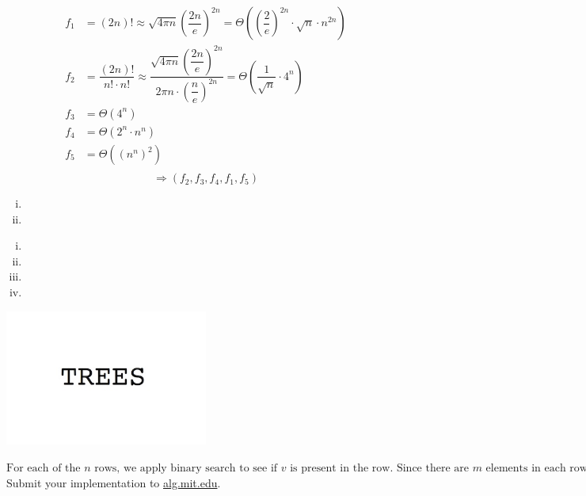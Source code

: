 \documentclass[12pt,twoside]{article}
\begin{document}
\begin{problems}
\begin{problemparts}
\problempart %
\begin{align*}
f_1 &= (2n)! \approx \sqrt{4\pi n} \left(\dfrac{2n}{e}\right)^{2n} = \Theta\left(\left(\dfrac{2}{e}\right)^{2n}\cdot \sqrt{n}  \cdot n^{2n}\right)\\
f_2 &= \dfrac{(2n)!}{n!\cdot n!} \approx \dfrac{\sqrt{4\pi n} \left(\dfrac{2n}{e}\right)^{2n}}{2\pi n\cdot\left(\dfrac{n}{e}\right)^{2n}}  =  \Theta\left(\dfrac{1}{\sqrt{n}}\cdot 4^{n}\right)  \\
f_3 &= \Theta(4^n) \\
f_4 &= \Theta(2^n \cdot n^n) \\
f_5 &= \Theta((n^n)^2) \\
\end{align*}
$$ \Rightarrow (f_2, f_3, f_4, f_1, f_5)$$


\end{problemparts}

\newpage
\problem  %

\begin{problemparts}
\problempart %
\begin{enumerate}[i.]
  \item %
  \item %
\end{enumerate}

\problempart %
\begin{enumerate}[i.]
  \item %
  \item %
  \item %
  \item %
\end{enumerate}
\begin{center}
  \includegraphics[width=0.5\textwidth]{img.jpg}
\end{center}
\end{problemparts}

\newpage
\problem  %

\begin{problemparts}
\problempart %
$\text{For each of the } n \text{ rows, we apply binary search to see if } v \text{ is present in the row. Since there are } m \text{ elements in each row, the running time for each of the } n \text{ rows will be }\log{m} \text{. Hence, in the worst case scenario where } v \text{ is not present in } A \text{, the algorithm is } O(n\log{m})$
\problempart %
\problempart %
\problempart Submit your implementation to {\small\url{alg.mit.edu}}.
\end{problemparts}

\end{problems}
\end{document}
